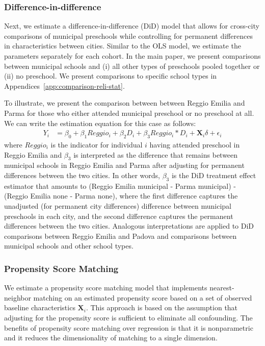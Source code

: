 \subsubsection{Difference-in-difference}  \label{subsubsection:DID}
Next, we estimate a difference-in-difference (DiD) model that allows for cross-city comparisons of municipal preschools while controlling for permanent differences in characteristics between cities. Similar to the OLS model, we estimate the parameters separately for each cohort. In the main paper, we present comparisons between municipal schools and (i) all other types of preschools pooled together or (ii) no preschool. We present comparisons to specific school types in Appendices~\ref{app:comparison-reli-stat}.

To illustrate, we present the comparison between between Reggio Emilia and Parma for those who either attended municipal preschool or no preschool at all. We can write the estimation equation for this case as follows:
\begin{eqnarray}  \label{eq:specific2}
Y_i & = \beta_0 + \beta_1 Reggio_i + \beta_2 D_i + \beta_3 Reggio_i * D_i + \bm{X}_i\delta + \epsilon_i
\end{eqnarray}
\noindent where $Reggio_i$ is the indicator for individual $i$ having attended preschool in Reggio Emilia and $\beta_3$ is interpreted as the difference that remains between municipal schools in Reggio Emilia and Parma after adjusting for permanent differences between the two cities. In other words, $\beta_3$ is the DiD treatment effect estimator that amounts to (Reggio Emilia municipal - Parma municipal) - (Reggio Emilia none - Parma none), where the first difference captures the unadjusted (for permanent city differences) difference between municipal preschools in each city, and the second difference captures the permanent differences between the two cities. Analogous interpretations are applied to DiD comparisons between Reggio Emilia and Padova and comparisons between municipal schools and other school types.


\subsubsection{Propensity Score Matching}  \label{subsubsection:psm}

We estimate a propensity score matching model that implements nearest-neighbor matching on an estimated propensity score based on a set of observed baseline characteristics $\boldsymbol{X}_i$. This approach is based on the assumption that adjusting for the propensity score is sufficient to eliminate all confounding. The benefits of propensity score matching over regression is that it is nonparametric and it reduces the dimensionality of matching to a single dimension.

